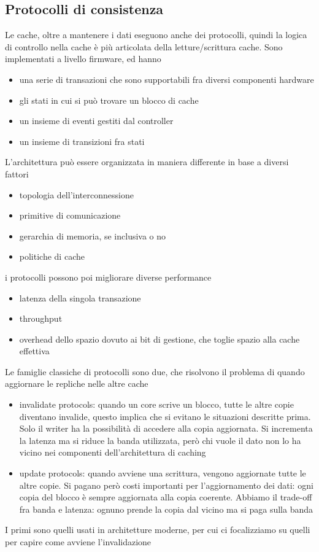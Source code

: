 \documentclass[14pt, oneside]{book}
\begin{document}
\subsection{Protocolli di consistenza}
Le cache, oltre a mantenere i dati eseguono anche dei protocolli, quindi la logica di controllo nella cache è più articolata della letture/scrittura cache. Sono implementati a livello firmware, ed hanno 
\begin{itemize}
\item una serie di transazioni che sono supportabili fra diversi componenti hardware
\item gli stati in cui si può trovare un blocco di cache
\item un insieme di eventi gestiti dal controller
\item un insieme di transizioni fra stati
\end{itemize}
L'architettura può essere organizzata in maniera differente in base a diversi fattori
\begin{itemize}
\item topologia dell'interconnessione
\item primitive di comunicazione
\item gerarchia di memoria, se inclusiva o no
\item politiche di cache
\end{itemize}
i protocolli possono poi migliorare diverse performance
\begin{itemize}
\item latenza della singola transazione
\item throughput 
\item overhead dello spazio dovuto ai bit di gestione, che toglie spazio alla cache effettiva
\end{itemize}
Le famiglie classiche di protocolli sono due, che risolvono il problema di quando aggiornare le repliche nelle altre cache 
\begin{itemize}
\item invalidate protocols: quando un core scrive un blocco, tutte le altre copie diventano invalide, questo implica che si evitano le situazioni descritte prima. Solo il writer ha la possibilità di accedere alla copia aggiornata. Si incrementa la latenza ma si riduce la banda utilizzata, però chi vuole il dato non lo ha vicino nei componenti dell'architettura di caching
\item update protocols: quando avviene una scrittura, vengono aggiornate tutte le altre copie. Si pagano però costi importanti per l'aggiornamento dei dati: ogni copia del blocco è sempre aggiornata alla copia coerente. Abbiamo il trade-off fra banda e latenza: ognuno prende la copia dal vicino ma si paga sulla banda
\end{itemize}
I primi sono quelli usati in architetture moderne, per cui ci focalizziamo su quelli per capire come avviene l'invalidazione
\end{document}
